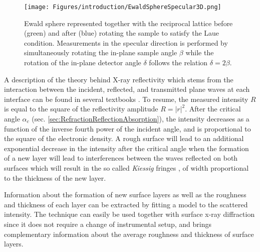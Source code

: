 \begin{figure}[!htb]
    \centering
    \texttt{[image: Figures/introduction/EwaldSphereSpecular3D.png]}
    \caption{
    Ewald sphere represented together with the reciprocal lattice before (green) and after (blue) rotating the sample to satisfy the Laue condition.
    Measurements in the specular direction is performed by simultaneously rotating the in-plane sample angle $\beta$ while the rotation of the in-plane detector angle $\delta$ follows the relation $\delta=2\beta$.
    }
    \label{fig:EwaldSphereSpecular}
\end{figure}

A description of the theory behind X-ray reflectivity which stems from the interaction between the incident, reflected, and transmitted plane waves at each interface can be found in several textbooks \parencite{Willmott}.
To resume, the measured intensity $R$ is equal to the square of the reflectivity amplitude $R=|r|^2$.
After the critical angle $\alpha_c$ (sec. \ref{sec:RefractionReflectionAbsorption}), the intensity decreases as a function of the inverse fourth power of the incident angle, and is proportional to the square of the electronic density.
A rough surface will lead to an additional exponential decrease in the intensity after the critical angle when the formation of a new layer will lead to interferences between the waves reflected on both surfaces which will result in the so called \textit{Kiessig} fringes \parencite{Kiessig1931}, of width proportional to the thickness of the new layer.

Information about the formation of new surface layers as well as the roughness and thickness of each layer can be extracted by fitting a model to the scattered intensity.
The technique can easily be used together with surface x-ray diffraction since it does not require a change of instrumental setup, and brings complementary information about the average roughness and thickness of surface layers.
